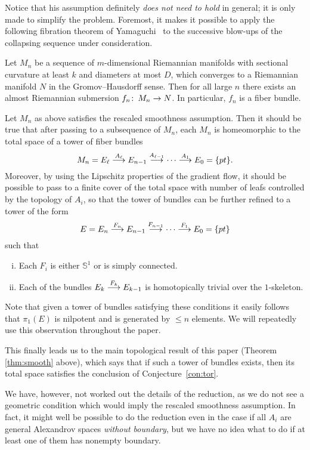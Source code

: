 \documentclass{amsart}
\begin{document}
Notice that his assumption definitely \emph{does not need to hold} in general;
it is only made to simplify the problem.
Foremost, it makes it possible to apply the following fibration theorem of Yamaguchi~\cite{Yam} to the successive blow-ups of the collapsing sequence under consideration.

\begin{thm}
Let $M_n$ be a sequence of $m$-dimensional Riemannian manifolds with sectional curvature at least $k$ 
and diameters at most $D$, which converges to a Riemannian manifold $N$ in the Gromov--Hausdorff sense.
Then for all large $n$ there exists an almost Riemannian submersion $f_n\colon\thinspace M_n\to N$.
In particular, $f_n$ is a fiber bundle.
\end{thm}

Let $M_n$ as above satisfies the rescaled smoothness assumption.
Then it should be true that after passing to a subsequence of $M_n$,
each $M_n$ is homeomorphic to the total space of a tower of fiber bundles
\[
M_n=E_\ell\buildrel {A_\ell}\over \longrightarrow E_{n-1}\buildrel {A_{\ell-1}}\over\longrightarrow\dots\buildrel {A_1}\over\longrightarrow E_0=\{pt\}.
\]
Moreover, by using the Lipschitz properties of the gradient flow,
it should be possible to pass to a finite cover of the total space with number of leafs 
controlled by the topology of $A_i$, so that the tower of bundles can be
further refined  to a tower of the form
\[
E=E_n\buildrel {F_n}\over \longrightarrow E_{n-1}\buildrel {F_{n-1}}\over\longrightarrow\dots\buildrel {F_1}\over\longrightarrow E_0=\{pt\}
\]
such that
\begin{enumerate}[(i)]
\item Each $F_i$ is either $\mathbb{S}^{1}$ or is simply connected. 
\item Each of the bundles $E_k\buildrel {F_k}\over \longrightarrow E_{k-1}$ is homotopically trivial over the $1$-skeleton. 
\end{enumerate}
Note that given a tower of bundles satisfying these conditions it easily follows that $\pi_1(E)$ is nilpotent and is generated by $\le n$ elements. We will repeatedly use this observation throughout the paper.

This finally leads us to the main topological result of this paper (Theorem \ref{thm:smooth} above),
which says that if such a tower of bundles exists, then its total space satisfies the conclusion of Conjecture~\ref{con:tor}.

We have, however, not worked out the details of the reduction, 
as we do not see a geometric condition which would imply the rescaled smoothness assumption.
In fact, it might  well be possible to do the reduction even in the case if all $A_i$ are general  Alexandrov spaces  \emph{without  boundary}, but we have no idea what to do if at least one of them has nonempty boundary.
\end{document}
